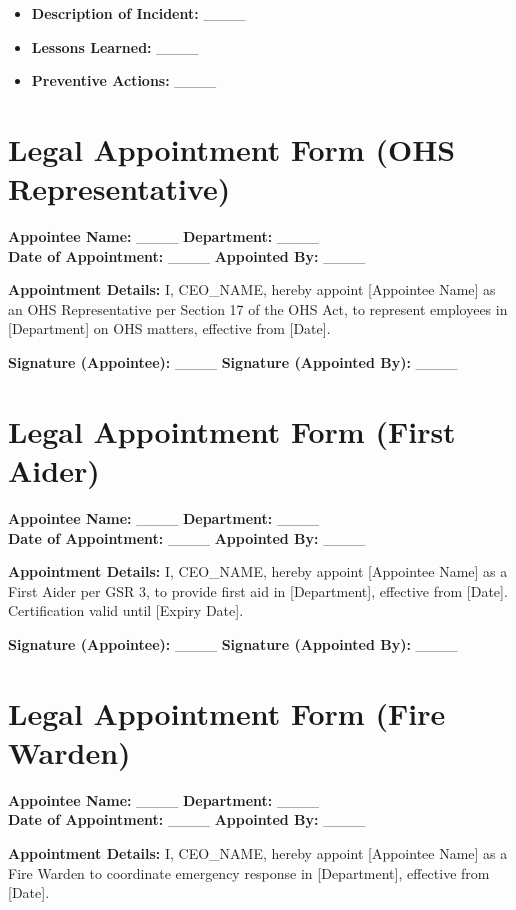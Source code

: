 \documentclass[12pt]{article}
\begin{document}
\begin{itemize}
    \item \textbf{Description of Incident:} \_\_\_\_
    \item \textbf{Lessons Learned:} \_\_\_\_
    \item \textbf{Preventive Actions:} \_\_\_\_
\end{itemize}

\section{Legal Appointment Form (OHS Representative)}

\textbf{Appointee Name:} \_\_\_\_ \textbf{Department:} \_\_\_\_\\
\textbf{Date of Appointment:} \_\_\_\_ \textbf{Appointed By:} \_\_\_\_

\textbf{Appointment Details:}
I, {{CEO_NAME}}, hereby appoint [Appointee Name] as an OHS Representative per Section 17 of the OHS Act, to represent employees in [Department] on OHS matters, effective from [Date].

\textbf{Signature (Appointee):} \_\_\_\_ \textbf{Signature (Appointed By):} \_\_\_\_

\section{Legal Appointment Form (First Aider)}

\textbf{Appointee Name:} \_\_\_\_ \textbf{Department:} \_\_\_\_\\
\textbf{Date of Appointment:} \_\_\_\_ \textbf{Appointed By:} \_\_\_\_

\textbf{Appointment Details:}
I, {{CEO_NAME}}, hereby appoint [Appointee Name] as a First Aider per GSR 3, to provide first aid in [Department], effective from [Date]. Certification valid until [Expiry Date].

\textbf{Signature (Appointee):} \_\_\_\_ \textbf{Signature (Appointed By):} \_\_\_\_

\section{Legal Appointment Form (Fire Warden)}

\textbf{Appointee Name:} \_\_\_\_ \textbf{Department:} \_\_\_\_\\
\textbf{Date of Appointment:} \_\_\_\_ \textbf{Appointed By:} \_\_\_\_

\textbf{Appointment Details:}
I, {{CEO_NAME}}, hereby appoint [Appointee Name] as a Fire Warden to coordinate emergency response in [Department], effective from [Date].
\end{document}
